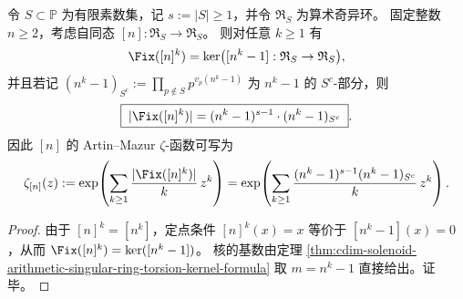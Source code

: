 \begin{corollary}\label{cor:cdim-arithmetic-singular-ring-periodic-point-count-artin-mazur-zeta}
令 \(S\subset\mathbb{P}\) 为有限素数集，记 \(s:=|S|\ge 1\)，并令 \(\mathfrak{R}_S\) 为算术奇异环。
固定整数 \(n\ge 2\)，考虑自同态 \([n]:\mathfrak{R}_S\to\mathfrak{R}_S\)。
则对任意 \(k\ge 1\) 有
\[
\Fix([n]^k)=\ker\bigl([n^k-1]:\mathfrak{R}_S\to \mathfrak{R}_S\bigr),
\]
并且若记
\(
(n^k-1)_{S^c}:=\prod_{p\notin S}p^{v_p(n^k-1)}
\)
为 \(n^k-1\) 的 \(S^c\)-部分，则
\[
\boxed{\;
|\Fix([n]^k)|=(n^k-1)^{s-1}\cdot (n^k-1)_{S^c}\; }.
\]
因此 \([n]\) 的 Artin--Mazur \(\zeta\)-函数可写为
\[
\zeta_{[n]}(z)
:=\exp\!\left(\sum_{k\ge 1}\frac{|\Fix([n]^k)|}{k}\,z^k\right)
=\exp\!\left(\sum_{k\ge 1}\frac{(n^k-1)^{s-1}(n^k-1)_{S^c}}{k}\,z^k\right).
\]
\end{corollary}

\begin{proof}
由于 \([n]^k=[n^k]\)，定点条件 \([n]^k(x)=x\) 等价于 \([n^k-1](x)=0\)，从而
\(
\Fix([n]^k)=\ker([n^k-1])
\)。
核的基数由定理 \ref{thm:cdim-solenoid-arithmetic-singular-ring-torsion-kernel-formula} 取 \(m=n^k-1\) 直接给出。证毕。
\end{proof}

\endinput

